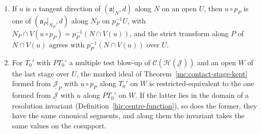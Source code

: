 \begin{theorem}
\begin{enumerate}
\item If \(u\) is a tangent direction of \((\mathfrak a|_N,d)\) along \(N\) on an open \(U\), then \(u\circ p_P\) is one of \((\mathfrak a_P|_{N_P},d)\) along \(N_P\) on \(p_P^{-1}U\),
with \(N_P\cap V(u\circ p_P)=p_P^{-1}(N\cap V(u))\), and the strict transform along \(P\) of \(N\cap V(u)\) agrees with \(p_P^{-1}(N\cap V(u))\) over \(U\).
\item For \(T_0'\) with \(PT_0'\) a multiple test blow-up of \(\mathcal C(\mathcal H(\underline{\mathcal J}))\) and an open \(W\) of the last stage over \(U\), the marked ideal of
Theorem~\ref{mc:contact-stage-kept} formed from \(\underline{\mathcal J}_P\) with \(u\circ p_P\) along \(T_0'\) on \(W\) is restricted-equivalent to the one formed from
\(\underline{\mathcal J}\) with \(u\) along \(PT_0'\) on \(W\). If the latter lies in the domain of a resolution invariant (Definition~\ref{hir:centre-function}), so does the former,
they have the same canonical segments, and along them the invariant takes the same values on the cosupport.
\end{enumerate}
\end{theorem}
